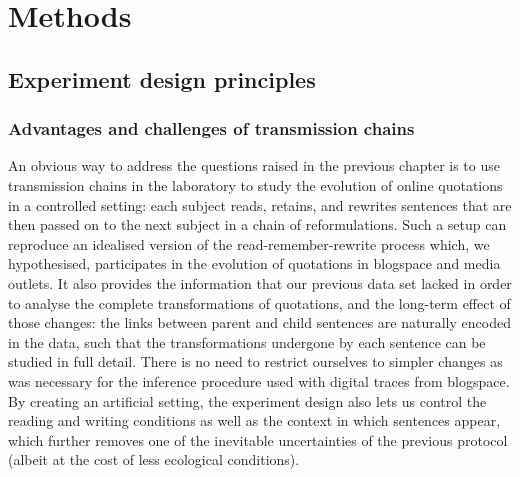 \documentclass[a4paper,fleqn]{cas-dc}
\begin{document}


\section{Methods}\label{sec:gistr-methods}

\subsection{Experiment design
principles}\label{experiment-design-principles}

\subsubsection{Advantages and challenges of transmission
chains}\label{advantages-and-challenges-of-transmission-chains}

An obvious way to address the questions raised in the previous chapter
is to use transmission chains in the laboratory to study the evolution
of online quotations in a controlled setting: each subject reads,
retains, and rewrites sentences that are then passed on to the next
subject in a chain of reformulations. Such a setup can reproduce an
idealised version of the read-remember-rewrite process which, we
hypothesised, participates in the evolution of quotations in blogspace
and media outlets. It also provides the information that our previous
data set lacked in order to analyse the complete transformations of
quotations, and the long-term effect of those changes: the links
between parent and child sentences are naturally encoded in the data,
such that the transformations undergone by each sentence can be studied
in full detail. There is no need to restrict ourselves to simpler
changes as was necessary for the inference procedure used with digital
traces from blogspace. By creating an artificial setting, the experiment
design also lets us control the reading and writing conditions as well
as the context in which sentences appear, which further removes one of
the inevitable uncertainties of the previous protocol (albeit at the
cost of less ecological conditions).
\end{document}
